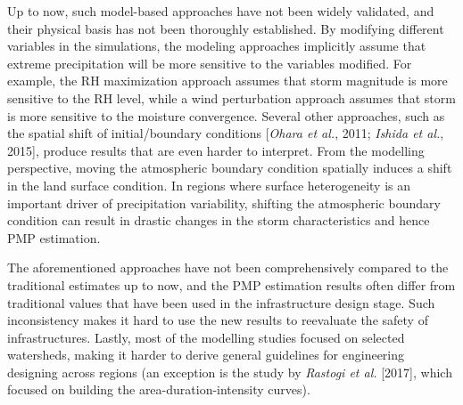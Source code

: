 Up to now, such model-based approaches have not been widely validated, and their physical basis has not been thoroughly established. By modifying different variables in the simulations, the modeling approaches implicitly assume that extreme precipitation will be more sensitive to the variables modified. For example, the RH maximization approach assumes that storm magnitude is more sensitive to the RH level, while a wind perturbation approach assumes that storm is more sensitive to the moisture convergence. Several other approaches, such as the spatial shift of initial/boundary conditions [\textit{Ohara et al.}, 2011; \textit{Ishida et al.}, 2015], produce results that are even harder to interpret. From the modelling perspective, moving the atmospheric boundary condition spatially induces a shift in the land surface condition. In regions where surface heterogeneity is an important driver of precipitation variability, shifting the atmospheric boundary condition can result in drastic changes in the storm characteristics and hence PMP estimation.

The aforementioned approaches have not been comprehensively compared to the traditional estimates up to now, and the PMP estimation results often differ from traditional values that have been used in the infrastructure design stage. Such inconsistency makes it hard to use the new results to reevaluate the safety of infrastructures. Lastly, most of the modelling studies focused on selected watersheds, making it harder to derive general guidelines for engineering designing across regions (an exception is the study by \textit{Rastogi et al.} [2017], which focused on building the area-duration-intensity curves).

